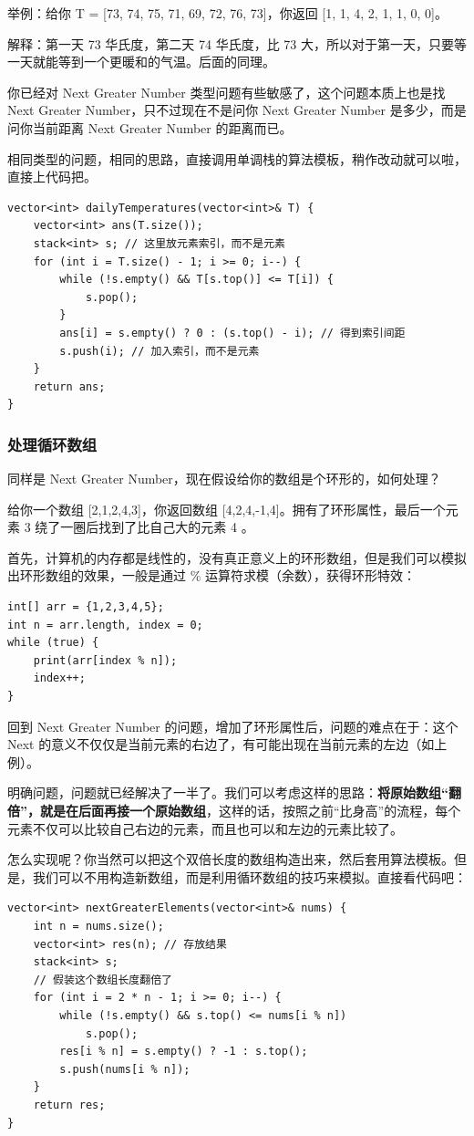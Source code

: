 \documentclass[12pt]{article}
\begin{document}
举例：给你 T = [73, 74, 75, 71, 69, 72, 76, 73]，你返回 [1, 1, 4, 2, 1, 1, 0, 0]。

解释：第一天 73 华氏度，第二天 74 华氏度，比 73 大，所以对于第一天，只要等一天就能等到一个更暖和的气温。后面的同理。

你已经对 Next Greater Number 类型问题有些敏感了，这个问题本质上也是找 Next Greater Number，只不过现在不是问你 Next Greater Number 是多少，而是问你当前距离 Next Greater Number 的距离而已。

相同类型的问题，相同的思路，直接调用单调栈的算法模板，稍作改动就可以啦，直接上代码把。
\begin{lstlisting}
vector<int> dailyTemperatures(vector<int>& T) {
    vector<int> ans(T.size());
    stack<int> s; // 这里放元素索引，而不是元素
    for (int i = T.size() - 1; i >= 0; i--) {
        while (!s.empty() && T[s.top()] <= T[i]) {
            s.pop();
        }
        ans[i] = s.empty() ? 0 : (s.top() - i); // 得到索引间距
        s.push(i); // 加入索引，而不是元素
    }
    return ans;
}
\end{lstlisting}

\subsubsection{处理循环数组}
同样是 Next Greater Number，现在假设给你的数组是个环形的，如何处理？

给你一个数组 [2,1,2,4,3]，你返回数组 [4,2,4,-1,4]。拥有了环形属性，最后一个元素 3 绕了一圈后找到了比自己大的元素 4 。

首先，计算机的内存都是线性的，没有真正意义上的环形数组，但是我们可以模拟出环形数组的效果，一般是通过 \% 运算符求模（余数），获得环形特效：
\begin{lstlisting}
int[] arr = {1,2,3,4,5};
int n = arr.length, index = 0;
while (true) {
    print(arr[index % n]);
    index++;
}
\end{lstlisting}

回到 Next Greater Number 的问题，增加了环形属性后，问题的难点在于：这个 Next 的意义不仅仅是当前元素的右边了，有可能出现在当前元素的左边（如上例）。

明确问题，问题就已经解决了一半了。我们可以考虑这样的思路：\textbf{将原始数组“翻倍”，就是在后面再接一个原始数组}，这样的话，按照之前“比身高”的流程，每个元素不仅可以比较自己右边的元素，而且也可以和左边的元素比较了。

怎么实现呢？你当然可以把这个双倍长度的数组构造出来，然后套用算法模板。但是，我们可以不用构造新数组，而是利用循环数组的技巧来模拟。直接看代码吧：
\begin{lstlisting}
vector<int> nextGreaterElements(vector<int>& nums) {
    int n = nums.size();
    vector<int> res(n); // 存放结果
    stack<int> s;
    // 假装这个数组长度翻倍了
    for (int i = 2 * n - 1; i >= 0; i--) {
        while (!s.empty() && s.top() <= nums[i % n])
            s.pop();
        res[i % n] = s.empty() ? -1 : s.top();
        s.push(nums[i % n]);
    }
    return res;
}
\end{lstlisting}
\end{document}
